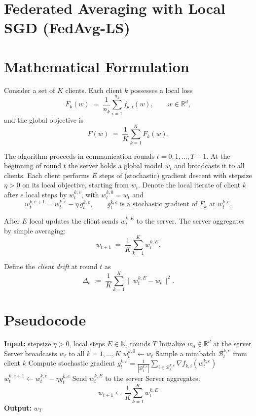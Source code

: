 \documentclass{article}
\newcommand{\R}{\mathbb{R}}
\begin{document}
\section*{Federated Averaging with Local SGD (FedAvg-LS)}

\section*{Mathematical Formulation}
Consider a set of $K$ clients.  Each client $k$ possesses a local loss 
\[
F_k(w)\;=\;\frac{1}{n_k}\sum_{i=1}^{n_k} f_{k,i}(w),\qquad w\in\R^d,
\]
and the global objective is 
\[
F(w)\;=\;\frac{1}{K}\sum_{k=1}^{K}F_k(w).
\]

The algorithm proceeds in communication rounds $t=0,1,\dots,T-1$.  
At the beginning of round $t$ the server holds a global model $w_t$ and
broadcasts it to all clients.  Each client performs $E$ steps of (stochastic)
gradient descent with stepsize $\eta>0$ on its local objective, starting from
$w_t$.  Denote the local iterate of client $k$ after $e$ local steps by
$w_{t}^{k,e}$, with $w_{t}^{k,0}=w_t$ and
\[
w_{t}^{k,e+1}=w_{t}^{k,e}-\eta\,g_{t}^{k,e},
\qquad
g_{t}^{k,e}\;\text{is a stochastic gradient of }F_k\text{ at }w_{t}^{k,e}.
\]

After $E$ local updates the client sends $w_{t}^{k,E}$ to the server.
The server aggregates by simple averaging:
\[
w_{t+1}\;=\;\frac{1}{K}\sum_{k=1}^{K} w_{t}^{k,E}.
\]

Define the \emph{client drift} at round $t$ as
\[
\Delta_t \;:=\; \frac{1}{K}\sum_{k=1}^{K}\bigl\| w_{t}^{k,E}-w_t \bigr\|^2 .
\]

\section*{Pseudocode}
\begin{algorithm}[H]
\caption{FedAvg with $E$ local SGD steps}
\begin{algorithmic}[1]
\State \textbf{Input:} stepsize $\eta>0$, local steps $E\in\mathbb{N}$, rounds $T$
\State Initialize $w_0\in\R^d$ at the server
    \State Server broadcasts $w_t$ to all $k=1,\dots,K$
        \State $w_{t}^{k,0}\gets w_t$
            \State Sample a minibatch $\mathcal{B}_{t}^{k,e}$ from client $k$
            \State Compute stochastic gradient 
            $g_{t}^{k,e}= \frac{1}{|\mathcal{B}_{t}^{k,e}|}\sum_{i\in\mathcal{B}_{t}^{k,e}}\nabla f_{k,i}(w_{t}^{k,e})$
            \State $w_{t}^{k,e+1}\gets w_{t}^{k,e}-\eta g_{t}^{k,e}$
        \EndFor
        \State Send $w_{t}^{k,E}$ to the server
    \EndFor
    \State Server aggregates:
    \[
    w_{t+1}\gets \frac{1}{K}\sum_{k=1}^{K} w_{t}^{k,E}
    \]
\EndFor
\State \textbf{Output:} $w_T$
\end{algorithmic}
\end{algorithm}
\end{document}
